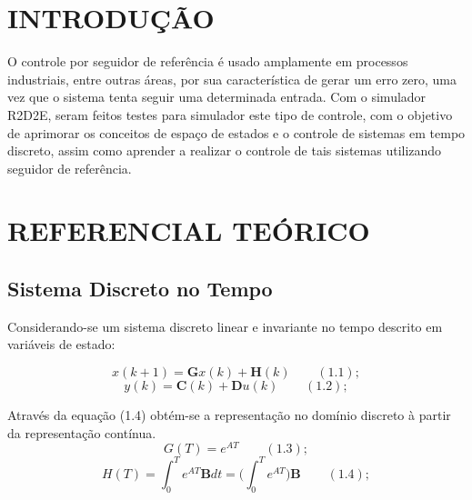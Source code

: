 \documentclass[a4paper,12pt]{article}
\begin{document}
\thispagestyle{empty}

\begin{center}
\tableofcontents
\end{center}

\newpage


\thispagestyle{main}

\section{INTRODUÇÃO}

\begin{flushleft}
\hspace{4ex}O controle por seguidor de referência é usado amplamente em processos industriais, entre outras áreas, por sua característica de gerar um erro zero, uma vez que o sistema tenta seguir uma determinada entrada. Com o simulador R2D2E, seram feitos testes para simulador este tipo de controle, com o objetivo de aprimorar os conceitos de espaço de estados e o controle de sistemas em tempo discreto, assim como aprender a realizar o controle de tais sistemas utilizando seguidor de referência. 

\end{flushleft}

\newpage


\thispagestyle{main}

\section{REFERENCIAL TEÓRICO}
\subsection{Sistema Discreto no Tempo}
\hspace{4ex}Considerando-se um sistema discreto linear e invariante no tempo descrito em variáveis de estado:

$$x(k+1)=\textbf{G}x(k)+\textbf{H}(k)\,\,\,\,\,\,\,\,\,\,\,\ (1.1);$$   
$$y(k)=\textbf{C}(k)+\textbf{D}u(k)\,\,\,\,\,\,\,\,\,\,\,\ (1.2);$$

\hspace{4ex} Através da equação (1.4)  obtém-se a representação no domínio discreto à partir da representação contínua.
	$$G(T)=e^{AT}\,\,\,\,\,\,\,\,\,\,\,\ (1.3);$$
    $$H(T)=\int_{0}^{T} e^{AT}\textbf{B}dt=\bigg(\int_{0}^{T} e^{AT}\bigg)\textbf{B}\,\,\,\,\,\,\,\,\,\,\,\ (1.4); $$
\end{document}
